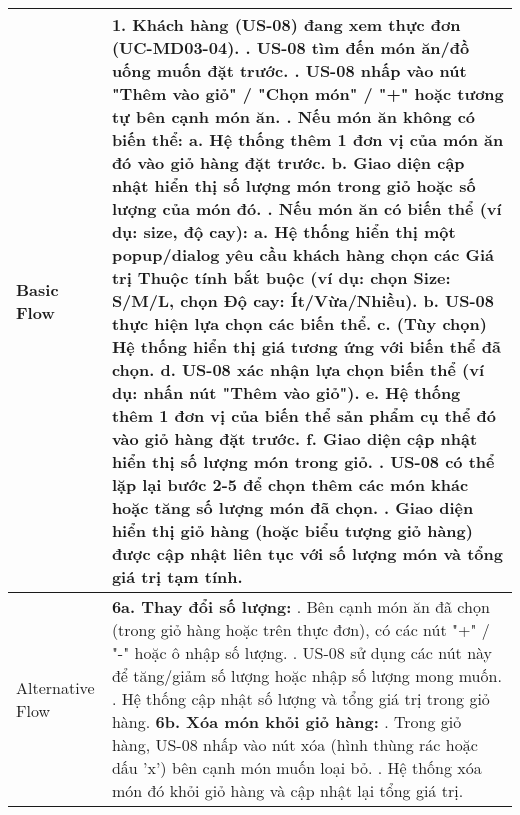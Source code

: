\begin{longtable}{|m{4cm}|p{11cm}|}
Basic Flow & 1. Khách hàng (US-08) đang xem thực đơn (UC-MD03-04). \newline 2. US-08 tìm đến món ăn/đồ uống muốn đặt trước. \newline 3. US-08 nhấp vào nút "Thêm vào giỏ" / "Chọn món" / "+" hoặc tương tự bên cạnh món ăn. \newline 4. \textbf{Nếu món ăn không có biến thể:} \newline    a. Hệ thống thêm 1 đơn vị của món ăn đó vào giỏ hàng đặt trước. \newline    b. Giao diện cập nhật hiển thị số lượng món trong giỏ hoặc số lượng của món đó. \newline 5. \textbf{Nếu món ăn có biến thể (ví dụ: size, độ cay):} \newline    a. Hệ thống hiển thị một popup/dialog yêu cầu khách hàng chọn các Giá trị Thuộc tính bắt buộc (ví dụ: chọn Size: S/M/L, chọn Độ cay: Ít/Vừa/Nhiều). \newline    b. US-08 thực hiện lựa chọn các biến thể. \newline    c. (Tùy chọn) Hệ thống hiển thị giá tương ứng với biến thể đã chọn. \newline    d. US-08 xác nhận lựa chọn biến thể (ví dụ: nhấn nút "Thêm vào giỏ"). \newline    e. Hệ thống thêm 1 đơn vị của biến thể sản phẩm cụ thể đó vào giỏ hàng đặt trước. \newline    f. Giao diện cập nhật hiển thị số lượng món trong giỏ. \newline 6. US-08 có thể lặp lại bước 2-5 để chọn thêm các món khác hoặc tăng số lượng món đã chọn. \newline 7. Giao diện hiển thị giỏ hàng (hoặc biểu tượng giỏ hàng) được cập nhật liên tục với số lượng món và tổng giá trị tạm tính. \\
\hline
Alternative Flow & \textbf{6a. Thay đổi số lượng:} \newline    1. Bên cạnh món ăn đã chọn (trong giỏ hàng hoặc trên thực đơn), có các nút "+" / "-" hoặc ô nhập số lượng. \newline    2. US-08 sử dụng các nút này để tăng/giảm số lượng hoặc nhập số lượng mong muốn. \newline    3. Hệ thống cập nhật số lượng và tổng giá trị trong giỏ hàng. \newline \textbf{6b. Xóa món khỏi giỏ hàng:} \newline    1. Trong giỏ hàng, US-08 nhấp vào nút xóa (hình thùng rác hoặc dấu 'x') bên cạnh món muốn loại bỏ. \newline    2. Hệ thống xóa món đó khỏi giỏ hàng và cập nhật lại tổng giá trị. \\

\end{longtable}
